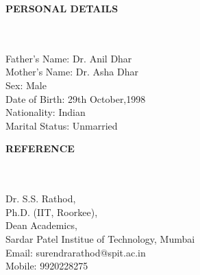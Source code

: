 \documentclass[a4paper,10pt]{article}
\newcommand{\lsep}{-0.5cm}
\newcommand{\resheading}[1]{{\small \colorbox{mygrey}{\begin{minipage}{0.975\textwidth}{\textbf{#1 \vphantom{p\^{E}}}}\end{minipage}}}}
\begin{document}
\resheading{\textbf{PERSONAL DETAILS} }\\\\[\lsep]

\indent Father's Name:   Dr. Anil Dhar\\ 
\indent Mother's Name:   Dr. Asha Dhar\\
\indent Sex:   Male\\
\indent Date of Birth:   29th October,1998\\
\indent Nationality:   Indian\\
\indent Marital Status:   Unmarried\\

\resheading{\textbf{REFERENCE} }\\\\[\lsep]

\indent Dr. S.S. Rathod, \\
\indent Ph.D. (IIT, Roorkee), \\
\indent Dean Academics, \\
\indent Sardar Patel Institue of Technology, Mumbai\\
\indent Email: surendra\textunderscore rathod@spit.ac.in\\
\indent Mobile: 9920228275
\end{document}
